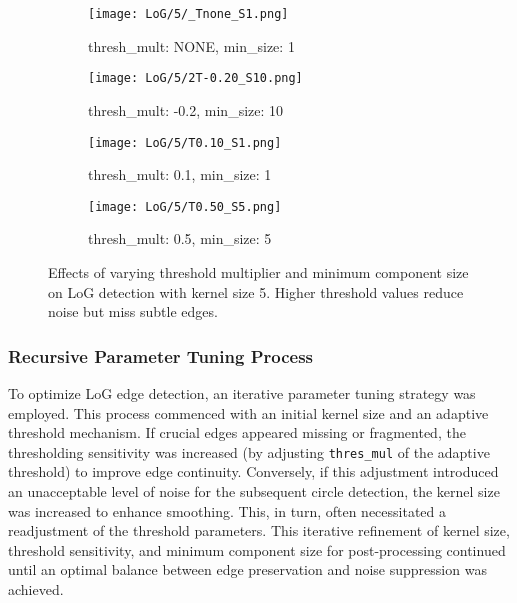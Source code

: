 \documentclass[12pt,a4paper]{article}
\begin{document}
\begin{figure}[H]
    \centering
    \begin{subfigure}{0.48\textwidth}
        \texttt{[image: LoG/5/\_Tnone\_S1.png]}
        \caption{thresh\_mult: NONE, min\_size: 1}
    \end{subfigure}
    \hfill
    \begin{subfigure}{0.48\textwidth}
        \texttt{[image: LoG/5/2T-0.20\_S10.png]}
        \caption{thresh\_mult: -0.2, min\_size: 10}
    \end{subfigure}
    
    \vspace{0.5cm}
    
    \begin{subfigure}{0.48\textwidth}
        \texttt{[image: LoG/5/T0.10\_S1.png]}
        \caption{thresh\_mult: 0.1, min\_size: 1}
    \end{subfigure}
    \hfill
    \begin{subfigure}{0.48\textwidth}
        \texttt{[image: LoG/5/T0.50\_S5.png]}
        \caption{thresh\_mult: 0.5, min\_size: 5}
    \end{subfigure}
    
    \caption{Effects of varying threshold multiplier and minimum component size on LoG detection with kernel size 5. Higher threshold values reduce noise but miss subtle edges.}
    \label{fig:log_param_effects}
\end{figure}


\subsubsection*{Recursive Parameter Tuning Process}

To optimize LoG edge detection, an iterative parameter tuning strategy was employed. This process commenced with an initial kernel size and an adaptive threshold mechanism. If crucial edges appeared missing or fragmented, the thresholding sensitivity was increased (by adjusting \texttt{thres\_mul} of the adaptive threshold) to improve edge continuity. Conversely, if this adjustment introduced an unacceptable level of noise for the subsequent circle detection, the kernel size was increased to enhance smoothing. This, in turn, often necessitated a readjustment of the threshold parameters. This iterative refinement of kernel size, threshold sensitivity, and minimum component size for post-processing continued until an optimal balance between edge preservation and noise suppression was achieved.
\end{document}
